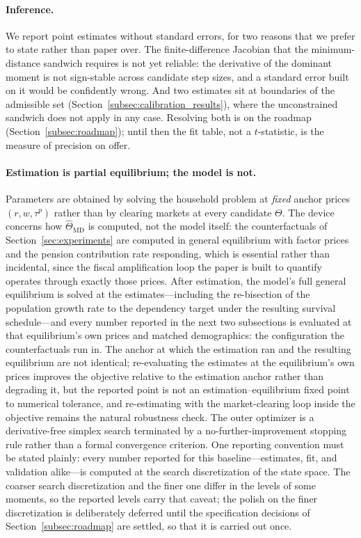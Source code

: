 \documentclass[12pt,a4paper]{article}
\begin{document}
\paragraph{Inference.} We report point estimates without standard errors, for two reasons that we prefer to state rather than paper over. The finite-difference Jacobian that the minimum-distance sandwich requires is not yet reliable: the derivative of the dominant moment is not sign-stable across candidate step sizes, and a standard error built on it would be confidently wrong. And two estimates sit at boundaries of the admissible set (Section~\ref{subsec:calibration_results}), where the unconstrained sandwich does not apply in any case. Resolving both is on the roadmap (Section~\ref{subsec:roadmap}); until then the fit table, not a $t$-statistic, is the measure of precision on offer.

\paragraph{Estimation is partial equilibrium; the model is not.} Parameters are obtained by solving the household problem at \emph{fixed} anchor prices $(r,w,\tau^p)$ rather than by clearing markets at every candidate $\Theta$. The device concerns how $\widehat\Theta_{\mathrm{MD}}$ is computed, not the model itself: the counterfactuals of Section~\ref{sec:experiments} are computed in general equilibrium with factor prices and the pension contribution rate responding, which is essential rather than incidental, since the fiscal amplification loop the paper is built to quantify operates through exactly those prices. After estimation, the model's full general equilibrium is solved at the estimates---including the re-bisection of the population growth rate to the dependency target under the resulting survival schedule---and every number reported in the next two subsections is evaluated at that equilibrium's own prices and matched demographics: the configuration the counterfactuals run in. The anchor at which the estimation ran and the resulting equilibrium are not identical; re-evaluating the estimates at the equilibrium's own prices improves the objective relative to the estimation anchor rather than degrading it, but the reported point is not an estimation--equilibrium fixed point to numerical tolerance, and re-estimating with the market-clearing loop inside the objective remains the natural robustness check. The outer optimizer is a derivative-free simplex search terminated by a no-further-improvement stopping rule rather than a formal convergence criterion. One reporting convention must be stated plainly: every number reported for this baseline---estimates, fit, and validation alike---is computed at the search discretization of the state space. The coarser search discretization and the finer one differ in the levels of some moments, so the reported levels carry that caveat; the polish on the finer discretization is deliberately deferred until the specification decisions of Section~\ref{subsec:roadmap} are settled, so that it is carried out once.
\end{document}

